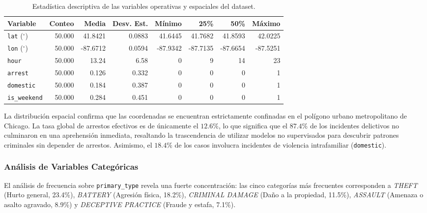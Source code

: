 \begin{table}[htbp]
\centering
\small
\begin{tabular}{lrrrrrrr}
\toprule
\textbf{Variable} & \textbf{Conteo} & \textbf{Media} & \textbf{Desv. Est.} & \textbf{Mínimo} & \textbf{25\%} & \textbf{50\%} & \textbf{Máximo} \\
\midrule
\texttt{lat} ($^\circ$) & 50.000 & 41.8421 & 0.0883 & 41.6445 & 41.7682 & 41.8593 & 42.0225 \\
\texttt{lon} ($^\circ$) & 50.000 & -87.6712 & 0.0594 & -87.9342 & -87.7135 & -87.6654 & -87.5251 \\
\texttt{hour} & 50.000 & 13.24 & 6.58 & 0 & 9 & 14 & 23 \\
\texttt{arrest} & 50.000 & 0.126 & 0.332 & 0 & 0 & 0 & 1 \\
\texttt{domestic} & 50.000 & 0.184 & 0.387 & 0 & 0 & 0 & 1 \\
\texttt{is\_weekend} & 50.000 & 0.284 & 0.451 & 0 & 0 & 0 & 1 \\
\bottomrule
\end{tabular}
\caption{Estadística descriptiva de las variables operativas y espaciales del dataset.}
\label{tab:estadistica_descriptiva}
\end{table}

\begin{interpretacionbox}
La distribución espacial confirma que las coordenadas se encuentran estrictamente confinadas en el polígono urbano metropolitano de Chicago. La tasa global de arrestos efectivos es de únicamente el $12.6\%$, lo que significa que el $87.4\%$ de los incidentes delictivos no culminaron en una aprehensión inmediata, resaltando la trascendencia de utilizar modelos no supervisados para descubrir patrones criminales sin depender de arrestos. Asimismo, el $18.4\%$ de los casos involucra incidentes de violencia intrafamiliar (\texttt{domestic}).
\end{interpretacionbox}

\subsubsection{Análisis de Variables Categóricas}

El análisis de frecuencia sobre \texttt{primary\_type} revela una fuerte concentración: las cinco categorías más frecuentes corresponden a \textit{THEFT} (Hurto general, 23.4\%), \textit{BATTERY} (Agresión física, 18.2\%), \textit{CRIMINAL DAMAGE} (Daño a la propiedad, 11.5\%), \textit{ASSAULT} (Amenaza o asalto agravado, 8.9\%) y \textit{DECEPTIVE PRACTICE} (Fraude y estafa, 7.1\%).

